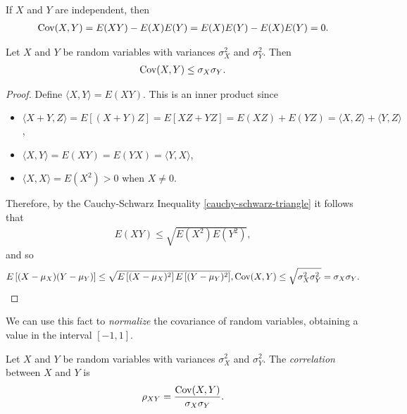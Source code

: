 \begin{rmk}
    If $X$ and $Y$ are independent, then
    \begin{align*}
        \operatorname{Cov}(X,Y) = E(XY) - E(X)E(Y) = E(X)E(Y) - E(X)E(Y) = 0.
    \end{align*}
\end{rmk}

\begin{prop}
    Let $X$ and $Y$ be random variables with variances $\sigma_X^2$ and $\sigma_Y^2$. Then
    \begin{align*}
        \operatorname{Cov}(X, Y) \leq \sigma_X\sigma_Y.
    \end{align*}
\end{prop}

\begin{proof}
    Define $\langle X, Y \rangle = E(XY)$. This is an inner product since
    \begin{itemize}
        \item $\langle X + Y, Z \rangle = E\left[(X + Y)Z\right] = E\left[XZ + YZ\right] = E(XZ) + E(YZ) = \langle X, Z \rangle + \langle Y, Z \rangle$,
        \item $\langle X, Y \rangle = E(XY) = E(YX) = \langle Y, X \rangle$,
        \item $\langle X, X \rangle = E(X^2) > 0$ when $X \neq 0$.
    \end{itemize}
    
    Therefore, by the Cauchy-Schwarz Inequality \ref{cauchy-schwarz-triangle} it follows that
    \begin{align*}
        E(XY) \leq \sqrt{E(X^2)E(Y^2)},
    \end{align*}
    and so
    \begin{align*}
        E\left[(X - \mu_X)(Y - \mu_Y)\right] \leq \sqrt{E\left[(X - \mu_X)^2\right]E\left[(Y - \mu_Y)^2\right]},
        \operatorname{Cov}(X, Y) \leq \sqrt{\sigma_{X}^2\sigma_{Y}^2} = \sigma_X\sigma_Y.
    \end{align*}
\end{proof}

\begin{rmk}
    We can use this fact to \emph{normalize} the covariance of random variables, obtaining a value in the interval $[-1, 1]$.
\end{rmk}

\begin{defn}
    Let $X$ and $Y$ be random variables with variances $\sigma_X^2$ and $\sigma_Y^2$. The \emph{correlation} between $X$ and $Y$ is
    \begin{align*}
        \rho_{XY} = \frac{\operatorname{Cov}(X,Y)}{\sigma_X\sigma_Y}.
    \end{align*}
\end{defn}

